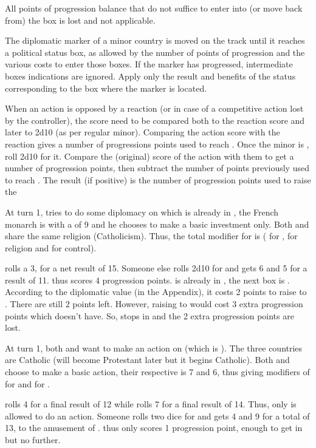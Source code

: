 \bparag All points of progression balance that do not suffice to enter into
(or move back from) the box is lost and not applicable.

\bparag The diplomatic marker of a minor country is moved on the track until
it reaches a political status box, as allowed by the number of points of
progression and the various costs to enter those boxes.  If the marker has
progressed, intermediate boxes indications are ignored. Apply only the result
and benefits of the status corresponding to the box where the marker is
located.

When an action is opposed by a reaction (or in case of a competitive action
lost by the controller), the score need to be compared both to the reaction
score and later to 2d10 (as per regular minor).
\bparag Comparing the action score with the reaction gives a number of
progressions points used to reach \Neutral.
\bparag Once the minor is \Neutral, roll 2d10 for it. Compare the (original)
score of the action with them to get a number of progression points, then
subtract the number of points previously used to reach \Neutral. The result
(if positive) is the number of progression points used to raise the

\begin{exemple}
  At turn 1, \FRA tries to do some diplomacy on \paysSavoie which is already
  in \MA, the French monarch is  with a \DIP of 9 and
  he chooses to make a basic investment only. Both \FRA and \paysSavoie share
  the same religion (Catholicism). Thus, the total modifier for \FRA is
   ( for \DIP,  for religion and  for
  control).

  \FRA rolls a 3, for a net result of 15. Someone else rolls 2d10 for
  \paysSavoie and gets 6 and 5 for a result of 11. \FRA thus scores 4
  progression points. \paysSavoie is already in \MA, the next box is
  \EC. According to the diplomatic value (in the Appendix), it costs 2 points
  to raise \paysSavoie to \EC. There are still 2 points left. However, raising
  \paysSavoie to \EW would cost 3 extra progression points which \FRA doesn't
  have. So, \paysSavoie stops in \EC and the 2 extra progression points are
  lost.
\end{exemple}

\begin{exemple}
  At turn 1, both \ANG and \HIS want to make an action on \paysPalatinat
  (which is \Neutral). The three countries are Catholic (\paysPalatinat will
  become Protestant later but it begins Catholic). Both \ANG and \HIS choose
  to make a basic action, their respective \DIP is 7 and 6, thus giving
  modifiers of  for \ANG and  for \HIS.

  \ANG rolls 4 for a final result of 12 while \HIS rolls 7 for a final result
  of 14. Thus, only \HIS is allowed to do an action. Someone rolls two dice
  for \paysPalatinat and gets 4 and 9 for a total of 13, to the amusement of
  \ANG. \HIS thus only scores 1 progression point, enough to get
  \paysPalatinat in \RM but no further.
\end{exemple}

